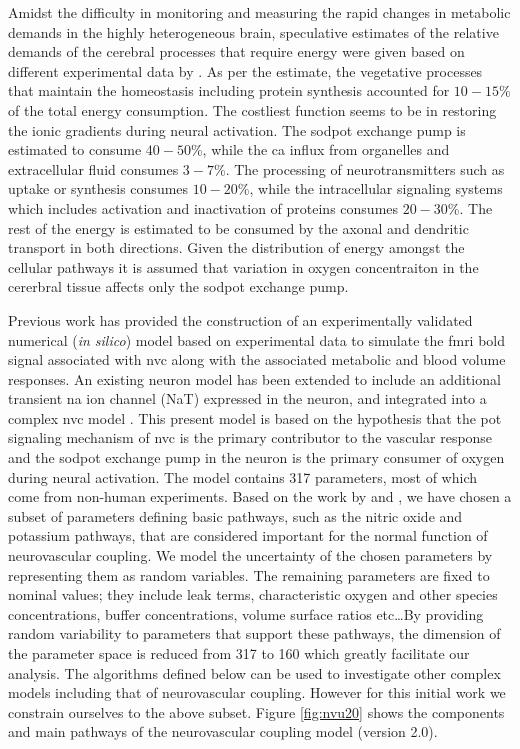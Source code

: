 Amidst the difficulty in monitoring and measuring the rapid changes in metabolic demands in the highly heterogeneous brain, speculative estimates of the relative demands of the cerebral processes that require energy were given based on different experimental data by \citet{Ames2000}. As per the estimate, the vegetative processes that maintain the homeostasis including protein synthesis accounted for $10-15$\% of the total energy consumption. The costliest function seems to be in  restoring the ionic gradients during neural activation. The \gls{sodpot} exchange pump is estimated to consume $40-50$\%, while the \gls{ca} influx from organelles and extracellular fluid consumes $3-7$\%. The processing of neurotransmitters such as uptake or synthesis consumes $10-20$\%, while the intracellular signaling systems which includes activation and inactivation of proteins consumes $20-30$\%. The rest of the energy is estimated to be consumed by the axonal and dendritic transport in both directions. Given the distribution of energy amongst the cellular pathways it is assumed that variation in oxygen concentraiton in the cererbral tissue affects only the \gls{sodpot} exchange pump. 

Previous work \cite{Mathias2018} has provided  the construction of an experimentally validated numerical (\textit{in silico}) model based on experimental data to simulate the \gls{fmri} \gls{bold} signal associated with \gls{nvc} along with the associated metabolic and blood volume responses. An existing neuron model \citep{Mathias2017, Mathias2017a} has been extended to include an additional transient \gls{na} ion channel (NaT) expressed in the neuron, and integrated into a complex \gls{nvc} model \citep{Dormanns2015, Dormanns2016, Kenny2017a}. This present model is based on the hypothesis that the \gls{pot} signaling mechanism of \gls{nvc} is the primary contributor to the vascular response and the \gls{sodpot} exchange pump in the neuron is the primary consumer of oxygen during neural activation. The model contains 317 parameters, most of which come from non-human experiments. Based on the work by \cite{Dormanns2016} and \cite{Kenny2018}, we have chosen a subset of parameters defining basic pathways, such as  the nitric oxide and potassium pathways,   that are considered important for the normal function of neurovascular coupling.  We model the uncertainty of the chosen parameters  by representing them as random variables. The remaining  parameters are fixed to nominal values; they include leak terms, characteristic oxygen and other species concentrations, buffer concentrations, volume surface ratios etc\dots By providing random variability to parameters that support these pathways, the dimension of the parameter space is reduced from 317 to 160 which greatly facilitate our analysis. The algorithms defined below can be used to investigate other complex models including that of neurovascular coupling. However for this initial work we constrain ourselves to the above subset. 
Figure \ref{fig:nvu20} shows the components and main pathways of the neurovascular coupling model (version 2.0). \\


